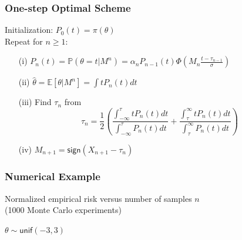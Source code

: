 \documentclass[mathserif]{beamer}
\newcommand{\sgn}{\mathsf{sign}}
\newcommand{\unif}{\mathsf{unif}}
\newcommand{\Prob}{\mathbb{P}}
\begin{document}
\begin{frame}[noframenumbering]
\frametitle{One-step Optimal Scheme}
Initialization: $P_0(t) = \pi(\theta)$ \\
Repeat for $n \geq 1$:
\begin{itemize}
\item[(i)] $P_n(t) = \Prob(\theta = t|M^n) = \alpha_n P_{n-1}(t) \Phi \left(M_n \frac{t-\tau_{n-1}}{\sigma} \right)$ 
\item[(ii)] $\widehat{\theta} = \mathbb E[\theta | M^n] = \int t P_n(t)dt $ 
\item[(iii)] Find $\tau_n$ from 
\[
\tau_n = \frac{1}{2} \left( \frac{ \int_{-\infty}^\tau t P_n(t)dt }{\int_{-\infty}^\tau P_n(t)dt}  + \frac{ \int_{\tau}^\infty t P_n(t)dt}{\int_{\tau}^\infty P_n(t)dt} \right)
\]
\item[(iv)] $M_{n+1} = \sgn(X_{n+1}-\tau_n)$
\end{itemize}
\end{frame}

\begin{frame}[noframenumbering]
\frametitle{Numerical Example}
\begin{center}
Normalized empirical risk versus number of samples $n$ \\
(1000 Monte Carlo experiments)
$\theta \sim \unif(-3,3)$
\end{center}
\end{frame}
\end{document}
